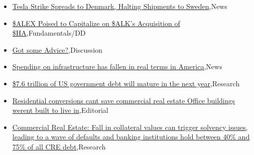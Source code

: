 \documentclass{article}%
\begin{document}
%
\begin{itemize}%
\item%
\href{https://reddit.com/r/wallstreetbets/comments/18badme/tesla\_strike\_spreads\_to\_denmark\_halting\_shipments/}{Tesla Strike Spreads to Denmark, Halting Shipments to Sweden},News%
\item%
\href{https://reddit.com/r/StockMarket/comments/18avosk/alex\_poised\_to\_capitalize\_on\_alks\_acquisition\_of/}{\$ALEX Poised to Capitalize on \$ALK's Acquisition of \$HA},Fundamentals/DD%
\item%
\href{https://reddit.com/r/StockMarket/comments/18aocp7/got\_some\_advice/}{Got some Advice?},Discussion%
\item%
\href{https://reddit.com/r/Economics/comments/18b32og/spending\_on\_infrastructure\_has\_fallen\_in\_real/}{Spending on infrastructure has fallen in real terms in America},News%
\item%
\href{https://reddit.com/r/Economics/comments/18b03o4/76\_trillion\_of\_us\_government\_debt\_will\_mature\_in/}{\$7.6 trillion of US government debt will mature in the next year},Research%
\item%
\href{https://reddit.com/r/Economics/comments/18avh9u/residential\_conversions\_cant\_save\_commercial\_real/}{Residential conversions cant save commercial real estate  Office buildings werent built to live in},Editorial%
\item%
\href{https://reddit.com/r/Economics/comments/18atr2a/commercial\_real\_estate\_fall\_in\_collateral\_values/}{Commercial Real Estate: Fall in collateral values can trigger solvency issues, leading to a wave of defaults  and banking institutions hold between 40\% and 75\% of all CRE debt},Research%
\end{itemize}%
\end{document}

